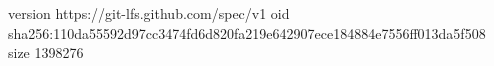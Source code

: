 version https://git-lfs.github.com/spec/v1
oid sha256:110da55592d97cc3474fd6d820fa219e642907ece184884e7556ff013da5f508
size 1398276
